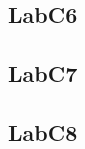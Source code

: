 \documentclass{article}
\begin{document}
\subsection{LabC6}

\pagebreak

\pagebreak

\subsection{LabC7}

\pagebreak

\pagebreak

\subsection{LabC8}



\end{document}
